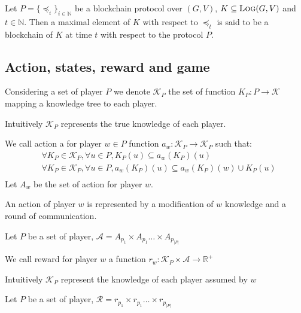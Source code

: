

\begin{mydef}
Let $P = \{ \preceq_i\}_{i \in \mathbb{N}}$ be a blockchain protocol over $(G,V)$, $K \subseteq \text{\sc Log}(G,V)$ and $t \in \mathbb{N}$. 
Then a maximal element of $K$ with respect to $\preceq_t$ is said to be a blockchain of $K$ at time $t$ with respect to the protocol $P$.
\end{mydef}




\subsection{Action, states, reward and game}

\begin{mydef}
	Considering a set of player $P$ we denote $\mathcal{K}_P$ the set of function $K_P : P \rightarrow \mathcal{K}$ mapping a knowledge tree to each player. 
\end{mydef}

Intuitively $\mathcal{K}_P$ represents the true knowledge of each player.

\begin{mydef}
	We call action a for player $w\in P$ function $a_w: \mathcal{K}_P \rightarrow \mathcal{K}_P$ such that: 
	\begin{eqnarray*}	
		&\forall K_P \in \mathcal{K}_P, \forall u \in P, K_P(u) \subseteq a_w(K_P)(u)  \\
		&\forall K_P \in \mathcal{K}_P, \forall u \in P, a_w(K_P)(u) \subseteq a_w(K_P)(w) \cup K_P(u)  \\
	\end{eqnarray*}
	Let $A_w$ be the set of action for player $w$.
\end{mydef}
An action of player $w$ is represented by a modification of $w$ knowledge and a round of communication. 

\begin{mydef}
	Let $P$ be a set of player, $\mathcal{A} = A_{p_1} \times A_{p_1} \ldots \times A_{p_{|P|}}$
\end{mydef}

\begin{mydef}
	We call reward for player $w$ a function $r_w : \mathcal{K}_P \times \mathcal{A} \rightarrow \mathbb{R}^+$ 
\end{mydef}
Intuitively $\mathcal{K}_P$ represent the knowledge of each player assumed by $w$

\begin{mydef}
	Let $P$ be a set of player, $\mathcal{R} = r_{p_1} \times r_{p_1} \ldots \times r_{p_{|P|}}$
\end{mydef}

